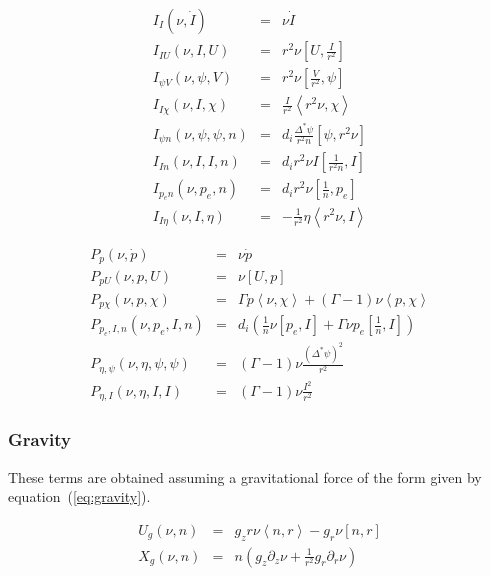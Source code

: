 \documentclass[letterpaper]{book}
\newcommand{\gs}[1]{\Delta^* #1}
\newcommand{\pb}[2]{\left[#1,#2\right]}
\newcommand{\ip}[2]{\left\langle  #1,#2\right\rangle}
\begin{document}
\begin{equation}
  \begin{array}{lcl}
    I_I (\nu, \dot{I}) & = & \nu \dot{I}\\
    I_{I U}(\nu, I, U) & = & r^2 \nu \pb{U}{\frac{I}{r^2}}\\
    I_{\psi V}(\nu, \psi, V) & = & r^2 \nu \pb{\frac{V}{r^2}}{\psi}\\
    I_{I \chi}(\nu, I, \chi) & = & \frac{I}{r^2} \ip{r^2 \nu}{\chi}\\
    I_{\psi n}(\nu, \psi, \psi, n) & = &
       d_i \frac{\gs{\psi}}{r^2 n}\pb{\psi}{r^2\nu}\\
    I_{I n}(\nu, I, I, n) & = &
       d_i r^2 \nu I \pb{\frac{1}{r^2 n}}{I}\\
    I_{p_e n}(\nu, p_e, n) & = & d_i r^2 \nu \pb{\frac{1}{n}}{p_e}\\
    I_{I \eta}(\nu, I, \eta) & = & -\frac{1}{r^2} \eta \ip{r^2 \nu}{I}
  \end{array}
\end{equation}

\begin{equation}
  \begin{array}{lcl}
  P_p(\nu, \dot{p}) & = & \nu \dot{p}
  \\
  P_{p U}(\nu, p, U) & = & \nu \pb{U}{p}
  \\
  P_{p \chi}(\nu, p, \chi) & = & \Gamma p \ip{\nu}{\chi} 
    + (\Gamma - 1) \nu \ip{p}{\chi}
  \\
  P_{p_e, I, n}(\nu, p_e, I, n) & = & d_i \left( 
      \frac{1}{n} \nu \pb{p_e}{I} 
    + \Gamma \nu p_e \pb{\frac{1}{n}}{I} \right)
  \\
  P_{\eta, \psi}(\nu, \eta, \psi, \psi) & = & (\Gamma - 1) \nu
  \frac{(\gs{\psi})^2}{r^2}
  \\
  P_{\eta, I}(\nu, \eta, I, I) & = & (\Gamma - 1) \nu \frac{I^2}{r^2}
  \end{array}
\end{equation}

\subsubsection{Gravity}

These terms are obtained assuming a gravitational force of the form given by
equation~(\ref{eq:gravity}).

\begin{equation}
  \begin{array}{lcl}
    U_g(\nu, n) & = & g_z r \nu \ip{n}{r} - g_r \nu \pb{n}{r}
    \\
    X_g(\nu, n) & = & n \left( g_z \partial_z \nu 
      + \frac{1}{r^2} g_r \partial_r \nu \right)
  \end{array}
\end{equation}
\end{document}
